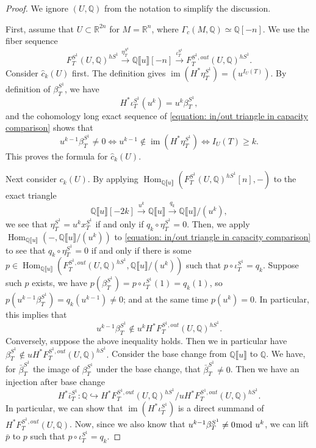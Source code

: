 \documentclass[11pt]{amsart}
\numberwithin{equation}{section}
\theoremstyle{plain}
\theoremstyle{definition}
\theoremstyle{remark}
\newcommand{\bQ} { {\mathbb{Q}}}
\newcommand{\bR} { {\mathbb{R}}}
\newcommand{\fpw}[1]{{\llbracket #1\rrbracket}}
\newcommand\im{ {\operatorname{im}} }
\newcommand\Hom{\operatorname{Hom}}
\begin{document}
\begin{proof}We ignore $(U,\bQ)$ from the notation to simplify the discussion. 

First, assume that $U \subset \bR^{2n}$ for $M=\bR^n$, where $\Gamma_c(M,\bQ)\simeq \bQ[-n]$. We use the fiber sequence
\begin{equation}\label{equation: in/out triangle in capacity comparison} F_T^{S^1}(U,\bQ)^{hS^1}\xrightarrow{\eta_T^{S^1}} \bQ\fpw{u}[-n] \xrightarrow{\iota_T^{S^1}} F_T^{S^1,out}(U,\bQ)^{hS^1}.  
\end{equation}
Consider $\widehat{c}_k(U)$ first. The definition gives $\im(H^*\eta_T^{S^1})=(u^{I_U(T)})$. By definition of $\beta_T^{S^1}$, we have 
\[H^*\iota_T^{S^1}(u^k)=u^k\beta_T^{S^1},\]
and the cohomology long exact sequence of \autoref{equation: in/out triangle in capacity comparison} shows that
\[u^{k-1}\beta_T^{S^1} \neq 0 \iff u^{k-1} \notin \im(H^*\eta_T^{S^1}) \iff I_U(T)\geq k.\]
This proves the formula for $\widehat{c}_k(U)$.

Next consider ${c}_k(U)$. By applying $\Hom_{\bQ\fpw{u}}(F_T^{S^1}(U,\bQ)^{hS^1}[n],-)$ to the exact triangle 
\[\bQ\fpw{u}[-2k]\xrightarrow{u^{k}}\bQ\fpw{u} \xrightarrow{q_k} \bQ\fpw{u}/(u^{k}),\]
we see that $\eta_T^{S^1}=u^kx_T^{S^1}$ if and only if $q_k \circ \eta_T^{S^1}=0$. Then, we apply $\Hom_{\bQ\fpw{u}}(-,\bQ\fpw{u}/(u^{k}))$ to \autoref{equation: in/out triangle in capacity comparison}
to see that $q_k\circ \eta_T^{S^1}=0$ if and only if there is some $p\in \Hom_{\bQ\fpw{u}}(F_T^{S^1,out}(U,\bQ)^{hS^1},\bQ\fpw{u}/(u^{k}))$ such that $p\circ \iota_T^{S^1} =q_k$. Suppose such $p$ exists, we have $p(\beta_T^{S^1})=p\circ \iota_T^{S^1}(1)=q_k(1)$, so $p(u^{k-1}\beta_T^{S^1})=q_k(u^{k-1})\neq 0$; and at the same time $p(u^k) = 0$. In particular, this implies that 
\[u^{k-1}\beta_T^{S^1}\notin u^kH^*F^{S^1,out}_{T}(U,\bQ)^{hS^1}.\]
Conversely, suppose the above inequality holds. Then we in particular have 
$\beta_T^{S^1}\notin uH^*F^{S^1,out}_{T}(U,\bQ)^{hS^1}.$
Consider the base change from $\bQ\fpw{u}$ to $\bQ$. We have, for $\bar{\beta}_T^{S^1}$ the image of $\beta_T^{S^1}$ under the base change, that $\bar{\beta}_T^{S^1}\neq 0$. Then we have an injection after base change
\[H^*\bar\iota_{T}^{S^1}: \bQ\hookrightarrow H^*F^{S^1,out}_{T}(U,\bQ)^{hS^1}/uH^*F^{S^1,out}_T(U,\bQ)^{hS^1}.\]
In particular, we can show that $\im(H^*\iota_T^{S^1})$ is a direct summand of $H^*F^{S^1,out}_{T}(U,\bQ)$. Now, since we also know that $u^{k-1}\beta_T^{S^1} \neq 0 \hspace{-6pt} \mod u^k$, we can lift $\bar p$ to $p$ such that $p\circ \iota_T^{S^1} =q_k$.


\end{proof}
\end{document}
